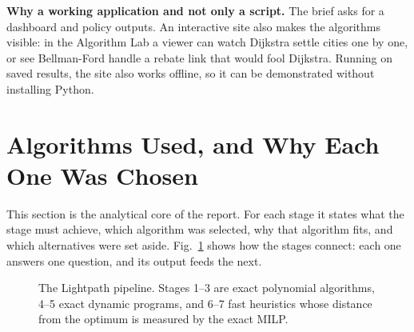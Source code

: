 \noindent\textbf{Why a working application and not only a script.} The brief asks for a dashboard and policy outputs. An interactive site also makes the algorithms visible: in the Algorithm Lab a viewer can watch Dijkstra settle cities one by one, or see Bellman-Ford handle a rebate link that would fool Dijkstra. Running on saved results, the site also works offline, so it can be demonstrated without installing Python.

\section{Algorithms Used, and Why Each One Was Chosen}\label{sec:algo}
This section is the analytical core of the report. For each stage it states what the stage must achieve, which algorithm was selected, why that algorithm fits, and which alternatives were set aside. Fig.~\ref{fig:pipeline} shows how the stages connect: each one answers one question, and its output feeds the next.

\begin{figure}[!htbp]
\centering
{}
\caption{The Lightpath pipeline. Stages 1--3 are exact polynomial algorithms, 4--5 exact dynamic programs, and 6--7 fast heuristics whose distance from the optimum is measured by the exact MILP.}\label{fig:pipeline}
\end{figure}

